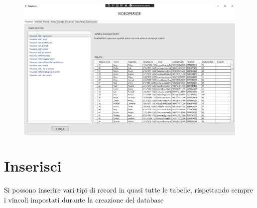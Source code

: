 \documentclass[a4paper,12pt]{report}
\begin{document}
\begin{figure}[ht]
    \begin{center}
        \centering
        \includegraphics[scale=0.3]{img/Applicazione/Visualizza.png}
    \end{center}
\end{figure}
\clearpage

\section{Inserisci}
Si possono inserire vari tipi di record in quasi tutte le tabelle, rispettando sempre i vincoli impostati durante la creazione del database
\end{document}
